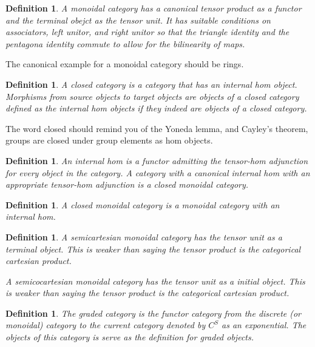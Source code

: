\documentclass{tufte-book}
\newtheorem{definition}[theorem]{Definition}
\begin{document}
 \begin{definition}
     A monoidal category has a canonical tensor product as a functor and the terminal obejct as the tensor unit. It has suitable conditions on associators, left unitor, and right unitor so that the triangle identity and the pentagona identity commute to allow for the bilinearity of maps.
 \end{definition}
 
 The canonical example for a monoidal category should be rings.
 
 \begin{definition}
     A closed category is a category that has an internal hom object. Morphisms from source objects to target objects are objects of a closed category defined as the internal hom objects if they indeed are objects of a closed category.
 \end{definition}
 
 The word closed should remind you of the Yoneda lemma, and Cayley's theorem, groups are closed under group elements as hom objects.
 
 \begin{definition}
     An internal hom is a functor admitting the tensor-hom adjunction for every object in the category. A category with a canonical internal hom with an appropriate tensor-hom adjunction is a closed monoidal category.
 \end{definition}
 
 \begin{definition}
     A closed monoidal category is a monoidal category with an internal hom.
 \end{definition}
 
 \begin{definition}
     A semicartesian monoidal category has the tensor unit as a terminal object. This is weaker than saying the tensor product is the categorical cartesian product.
 
     A semicocartesian monoidal category has the tensor unit as a initial object. This is weaker than saying the tensor product is the categorical cartesian product.
 \end{definition}
 
 \begin{definition}
     The graded category is the functor category from the discrete (or monoidal) category to the current category denoted by $C^S$ as an exponential. The objects of this category is serve as the definition for graded objects.
 \end{definition}
 
\end{document}
